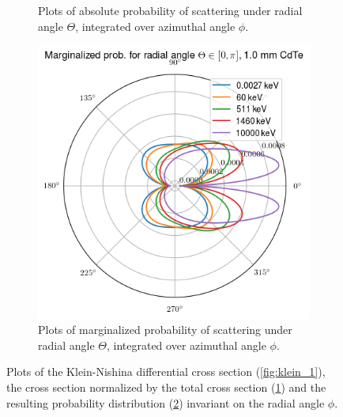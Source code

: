 \documentclass[a4paper,12pt,titlepage, twoside]{article}
\begin{document}
\begin{figure}
\begin{subfigure}{0.48\textwidth}
    \caption{Plots of absolute probability of scattering under radial angle $\Theta$, integrated over azimuthal angle $\phi$.}
    \label{fig:klein_2}
  \end{subfigure}
  \begin{subfigure}{0.48\textwidth}
    \includegraphics[width=1.0\textwidth]{./fig/klein_nishina_3.png}
    \caption{Plots of marginalized probability of scattering under radial angle $\Theta$, integrated over azimuthal angle $\phi$.}
    \label{fig:klein_3}
  \end{subfigure}
  \caption{Plots of the Klein-Nishina differential cross section (\ref{fig:klein_1}), the cross section normalized by the total cross section (\ref{fig:klein_2}) and the resulting probability distribution (\ref{fig:klein_3}) invariant on the radial angle $\phi$.}
  \label{fig:klein_nishina}
\end{figure}
\end{document}
